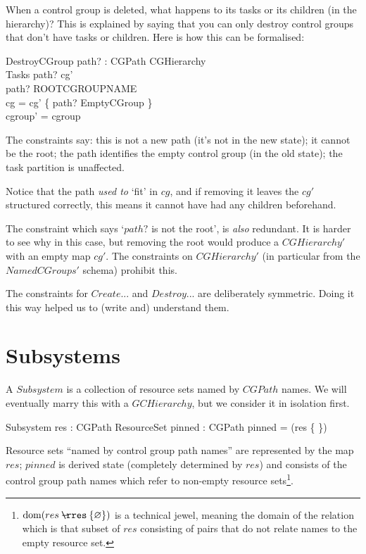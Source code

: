 \documentclass[a4paper,twoside,12pt]{article}
\begin{document}
When a control group is deleted, what happens to its tasks or its children (in the hierarchy)?
This is explained by saying that you can only destroy control groups that don't have tasks or children.
Here is how this can be formalised:

\begin{schema}{DestroyCGroup}
path? : CGPath
\also
\Delta CGHierarchy \\
\Xi Tasks
\where
path? \notin \dom cg' \\
path? \neq ROOTCGROUPNAME \\
cg = cg' \cup \{ path? \mapsto EmptyCGroup \} \\
cgroup' = cgroup
\end{schema}
The constraints say: this is not a new path (it's not in the new state); it cannot be the root;
the path identifies the empty control group (in the old state); the task partition is unaffected.

Notice that the path \emph{used to} `fit' in $cg$, and if removing it leaves the $cg'$ structured correctly,
this means it cannot have had any children beforehand.

The constraint which says `$path?$ is not the root', is \emph{also} redundant.
It is harder to see why in this case, but removing the root would produce a $CGHierarchy'$ with an empty map $cg'$.
The constraints on $CGHierarchy'$ (in particular from the $NamedCGroups'$ schema) prohibit this.

The constraints for $Create$... and $Destroy$... are deliberately symmetric.
Doing it this way helped us to (write and) understand them.

\section{Subsystems}
\label{sec:ss}

A $Subsystem$ is a collection of resource sets named by $CGPath$ names. We will eventually marry
this with a $GCHierarchy$, but we consider it in isolation first.
\begin{schema}{Subsystem}
res : CGPath \ffun ResourceSet
\also
pinned : \finset CGPath
\where
pinned = \dom(res \nrres \{ \emptyset \})
\end{schema}
Resource sets ``named by control group path names'' are represented by the map $res$;
$pinned$ is derived state (completely determined by $res$) and consists of the control group path
names which refer to non-empty resource sets\footnote{$\dom(res \nrres \{ \emptyset \})$
is a technical jewel, meaning the domain
of the relation which is that subset of $res$ consisting of pairs that do not relate names to the empty
resource set.}.
\end{document}
